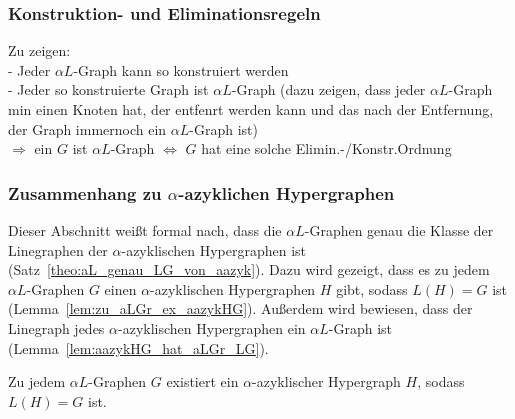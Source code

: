 \subsubsection{Konstruktion- und Eliminationsregeln}
Zu zeigen:\\
- Jeder $\alpha L$-Graph kann so konstruiert werden\\
- Jeder so konstruierte Graph ist $\alpha L$-Graph (dazu zeigen, dass jeder $\alpha L$-Graph min einen Knoten hat, der entfenrt werden kann und das nach der Entfernung, der Graph immernoch ein $\alpha L$-Graph ist)\\
$\Rightarrow$ ein $G$ ist $\alpha L$-Graph $\Leftrightarrow$ $G$ hat eine solche Elimin.-/Konstr.Ordnung\\

\subsubsection{Zusammenhang zu $\alpha$-azyklichen Hypergraphen}
Dieser Abschnitt weißt formal nach, dass die $\alpha L$-Graphen genau die Klasse der Linegraphen der $\alpha$-azyklischen Hypergraphen ist (Satz~\ref{theo:aL_genau_LG_von_aazyk}). Dazu wird gezeigt, dass es zu jedem $\alpha L$-Graphen $G$ einen $\alpha$-azyklischen Hypergraphen $H$ gibt, sodass $L(H)=G$ ist (Lemma~\ref{lem:zu_aLGr_ex_aazykHG}). Außerdem wird bewiesen, dass der Linegraph jedes $\alpha$-azyklischen Hypergraphen ein $\alpha L$-Graph ist (Lemma~\ref{lem:aazykHG_hat_aLGr_LG}).

\begin{Lemma}\label{lem:zu_aLGr_ex_aazykHG}
    Zu jedem $\alpha L$-Graphen $G$ existiert ein $\alpha$-azyklischer Hypergraph $H$, sodass $L(H)=G$ ist.
\end{Lemma}

